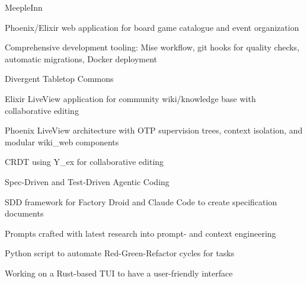 
\begin{cventries}
  \vspace{-1mm}
  \cventry
  {MeepleInn}
  {}
  {}
  {}
  {
    \begin{cvitems}
      \item Phoenix/Elixir web application for board game catalogue and event organization
      \item Comprehensive development tooling: Mise workflow, git hooks for quality checks, automatic migrations, Docker deployment
    \end{cvitems}
  }

  \vspace{-1mm}
  \cventry
  {Divergent Tabletop Commons}
  {}
  {}
  {}
  {
    \begin{cvitems}
      \item Elixir LiveView application for community wiki/knowledge base with collaborative editing
      \item Phoenix LiveView architecture with OTP supervision trees, context isolation, and modular wiki\_web components
      \item CRDT using Y\_ex for collaborative editing
    \end{cvitems}
  }

  \vspace{-1mm}
  \cventry
  {Spec-Driven and Test-Driven Agentic Coding}
  {}
  {}
  {}
  {
    \begin{cvitems}
      \item SDD framework for Factory Droid and Claude Code to create specification documents
      \item Prompts crafted with latest research into prompt- and context engineering
      \item Python script to automate Red-Green-Refactor cycles for tasks
      \item Working on a Rust-based TUI to have a user-friendly interface
    \end{cvitems}
  }

\end{cventries}

